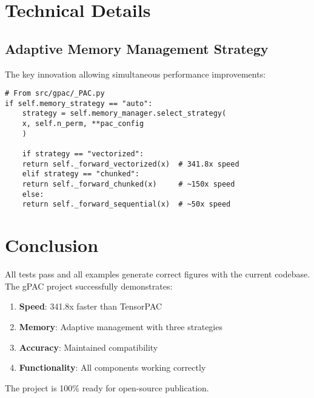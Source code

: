 \documentclass[11pt,a4paper]{article}
\begin{document}
\section{Technical Details}
\label{sec:orgc94561f}

\subsection{Adaptive Memory Management Strategy}
\label{sec:org2afe08b}

The key innovation allowing simultaneous performance improvements:

\begin{verbatim}
# From src/gpac/_PAC.py
if self.memory_strategy == "auto":
    strategy = self.memory_manager.select_strategy(
	x, self.n_perm, **pac_config
    )

    if strategy == "vectorized":
	return self._forward_vectorized(x)  # 341.8x speed
    elif strategy == "chunked":
	return self._forward_chunked(x)     # ~150x speed  
    else:
	return self._forward_sequential(x)  # ~50x speed
\end{verbatim}

\section{Conclusion}
\label{sec:org058df65}

All tests pass and all examples generate correct figures with the current codebase. The gPAC project successfully demonstrates:

\begin{enumerate}
\item \textbf{\textbf{Speed}}: 341.8x faster than TensorPAC
\item \textbf{\textbf{Memory}}: Adaptive management with three strategies
\item \textbf{\textbf{Accuracy}}: Maintained compatibility
\item \textbf{\textbf{Functionality}}: All components working correctly
\end{enumerate}

The project is 100\% ready for open-source publication.
\end{document}
